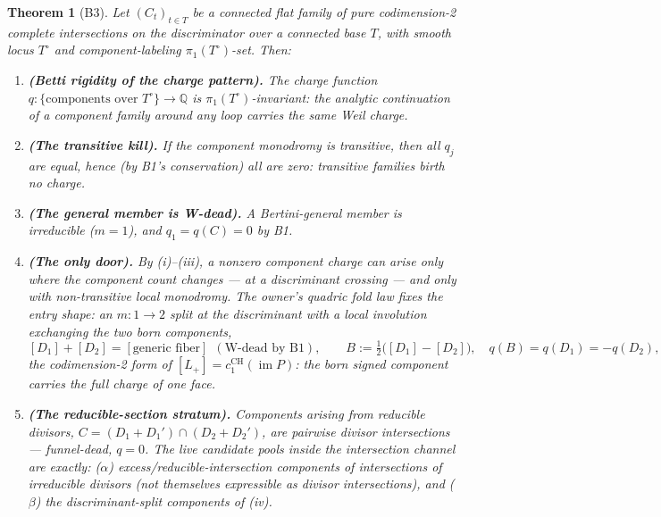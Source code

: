 \documentclass[11pt]{article}
\newtheorem{theorem}[lemma]{Theorem}
\newcommand{\CH}{\operatorname{CH}}
\begin{document}
\begin{theorem}[B3]
Let $(C_t)_{t \in T}$ be a connected flat family of pure codimension-2
complete intersections on the discriminator over a connected base $T$, with
smooth locus $T^\circ$ and component-labeling $\pi_1(T^\circ)$-set. Then:
\begin{enumerate}
\item[(i)] \textbf{(Betti rigidity of the charge pattern).} The charge
function $q: \{\text{components over } T^\circ\} \to \mathbb Q$ is
$\pi_1(T^\circ)$-invariant: the analytic continuation of a component family
around any loop carries the same Weil charge.
\item[(ii)] \textbf{(The transitive kill).} If the component monodromy is
transitive, then all $q_j$ are equal, hence (by B1's conservation) all are
zero: \emph{transitive families birth no charge.}
\item[(iii)] \textbf{(The general member is W-dead).} A Bertini-general
member is irreducible ($m = 1$), and $q_1 = q(C) = 0$ by B1.
\item[(iv)] \textbf{(The only door).} By (i)--(iii), a nonzero component
charge can arise only where the component count changes --- at a discriminant
crossing --- and only with non-transitive local monodromy. The owner's quadric
fold law fixes the entry shape: an $m{:}1 \to 2$ split at the discriminant
with a local involution exchanging the two born components,
\[
[D_1] + [D_2] = [\text{generic fiber}] \ \ (\text{W-dead by B1}), \qquad
B := \tfrac{1}{2}\bigl([D_1] - [D_2]\bigr), \quad q(B) = q(D_1) = -q(D_2),
\]
the codimension-2 form of $[L_+] = c_1^{\CH}(\operatorname{im}P)$: the born
signed component carries the full charge of one face.
\item[(v)] \textbf{(The reducible-section stratum).} Components arising from
reducible divisors, $C = (D_1 + D_1') \cap (D_2 + D_2')$, are pairwise divisor
intersections --- funnel-dead, $q = 0$. The live candidate pools inside the
intersection channel are exactly: ($\alpha$) excess/reducible-intersection
components of intersections of irreducible divisors (not themselves expressible
as divisor intersections), and ($\beta$) the discriminant-split components of
(iv).
\end{enumerate}
\end{theorem}
\end{document}
